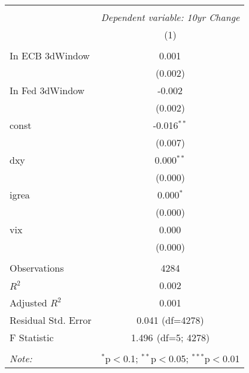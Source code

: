 \begin{table}[!htbp] \centering
\begin{tabular}{@{\extracolsep{5pt}}lc}
\\[-1.8ex]\hline
\hline \\[-1.8ex]
& \multicolumn{1}{c}{\textit{Dependent variable: 10yr Change}} \
\cr \cline{2-2}
\\[-1.8ex] & (1) \\
\hline \\[-1.8ex]
 In ECB 3dWindow & 0.001$^{}$ \\
& (0.002) \\
 In Fed 3dWindow & -0.002$^{}$ \\
& (0.002) \\
 const & -0.016$^{**}$ \\
& (0.007) \\
 dxy & 0.000$^{**}$ \\
& (0.000) \\
 igrea & 0.000$^{*}$ \\
& (0.000) \\
 vix & 0.000$^{}$ \\
& (0.000) \\
\hline \\[-1.8ex]
 Observations & 4284 \\
 $R^2$ & 0.002 \\
 Adjusted $R^2$ & 0.001 \\
 Residual Std. Error & 0.041 (df=4278) \\
 F Statistic & 1.496$^{}$ (df=5; 4278) \\
\hline
\hline \\[-1.8ex]
\textit{Note:} & \multicolumn{1}{r}{$^{*}$p$<$0.1; $^{**}$p$<$0.05; $^{***}$p$<$0.01} \\
\end{tabular}
\end{table}